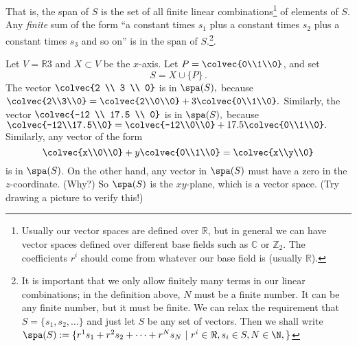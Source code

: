 That is, the span of \(S\) is the set of all finite linear combinations\footnote{Usually our vector spaces are defined over \(\mathbb{R}\), but in general we can have vector spaces defined over different base fields such as \(\mathbb{C}\) or \(\mathbb{Z}_2\). The coefficients \(r^i\) should come from whatever our base field is (usually \(\mathbb{R}\)).} of elements of \(S\). Any {\itshape finite} sum of the form ``a constant times \(s_1\) plus a constant times \(s_2\) plus a constant times \(s_3\) and so on'' is in the span of \(S\).\footnote{It is important that we only allow finitely many terms in our linear combinations; in the definition above, \(N\) must be a finite number. It can be any finite number, but it must be finite. We can relax the requirement that $S=\{s_1,s_2,\ldots\}$ and just let $S$ be any set of vectors. Then we shall write $\spa(S):=\{ r^1s_1+r^2s_2+\cdots + r^Ns_N ~|~ r^i\in \Re, s_i\in S, N\in \N, \}$
 }.

\begin{example}
Let $V=\mathbb{R}3$ and $X\subset V$ be the $x$-axis.  Let $P=\colvec{0\\1\\0}$, and set \[S=X \cup \{P\}\, .\]
The vector \(\colvec{2 \\ 3 \\ 0}\) is in \(\spa(S),\) because \(\colvec{2\\3\\0}=\colvec{2\\0\\0}+3\colvec{0\\1\\0}.\) Similarly, the vector \(\colvec{-12 \\ 17.5 \\ 0}\) is in \(\spa(S),\) because \(\colvec{-12\\17.5\\0}=\colvec{-12\\0\\0}+17.5\colvec{0\\1\\0}.\)
Similarly, any vector of the form
\[
\colvec{x\\0\\0}+y \colvec{0\\1\\0} = \colvec{x\\y\\0}
\]
is in \(\spa(S)\). On the other hand, any vector in \(\spa(S)\) must have a zero in the \(z\)-coordinate. (Why?) 
So $\spa(S)$ is the $xy$-plane, which is a vector space.  (Try drawing a picture to verify this!)
\end{example}

